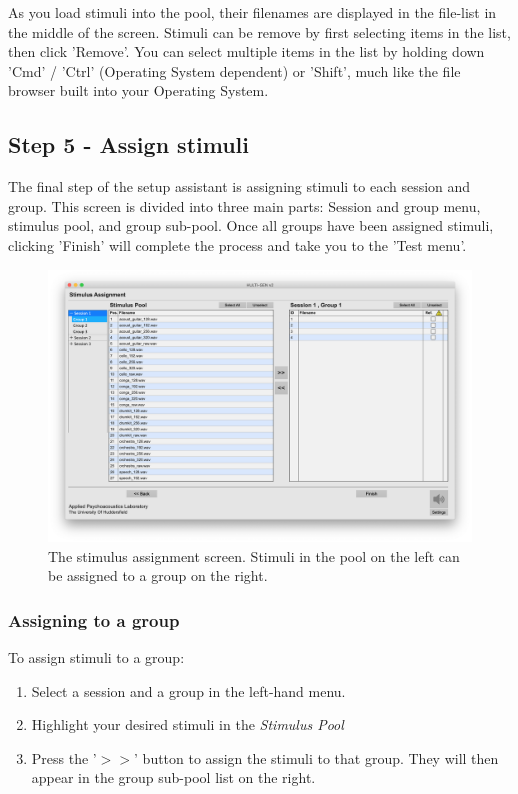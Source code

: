 \noindent
As you load stimuli into the pool, their filenames are displayed in the file-list in the middle of the screen. Stimuli can be remove by first selecting items in the list, then click 'Remove'. You can select multiple items in the list by holding down 'Cmd' / 'Ctrl' (Operating System dependent) or 'Shift', much like the file browser built into your Operating System.
\pagebreak

\subsection{Step 5 - Assign stimuli}
The final step of the setup assistant is assigning stimuli to each session and group. This screen is divided into three main parts: Session and group menu, stimulus pool, and group sub-pool. Once all groups have been assigned stimuli, clicking 'Finish' will complete the process and take you to the 'Test menu'.

\begin{figure}[ht]
	\centering
	\includegraphics[width=1.0\textwidth]{./images/createTest_step06_stimulusAssign.png}
	\caption{The stimulus assignment screen. Stimuli in the pool on the left can be assigned to a group on the right.}
	\label{create::stimulusAssign}
\end{figure}

\subsubsection{Assigning to a group}
To assign stimuli to a group:
\begin{enumerate}
	\item Select a session and a group in the left-hand menu.
	\item Highlight your desired stimuli in the \emph{Stimulus Pool}
	\item Press the '$>>$' button to assign the stimuli to that group. They will then appear in the group sub-pool list on the right.
\end{enumerate}

